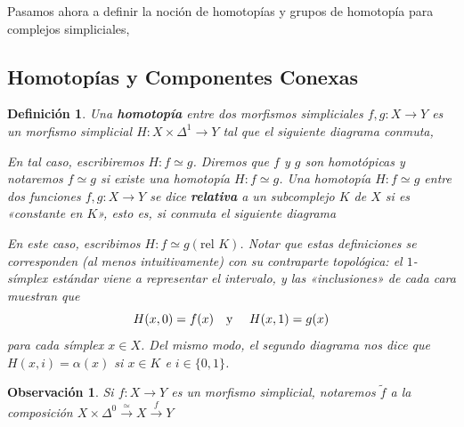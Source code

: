 \documentclass[11pt]{report}
\theoremstyle{colored}
\newtheorem{definition}{Definición}[section]
\newtheorem{remark}{Observación}[section]
\renewcommand{\ss}[1]{\Delta^{#1}}
\newcommand{\guill}[1]{«#1»}
\begin{document}
Pasamos ahora a definir la noción de homotopías y grupos de homotopía para complejos simpliciales,

\subsection{Homotopías y Componentes Conexas}

\begin{definition} Una \textbf{homotopía} entre dos morfismos simpliciales $f,g : X \to Y$ es un morfismo simplicial $H : X \times \ss{1} \to Y$ tal que el siguiente diagrama conmuta,
\begin{center}
\end{center}
En tal caso, escribiremos $H : f \simeq g$. Diremos que $f$ y $g$ son homotópicas y notaremos $f \simeq g$ si existe una homotopía $H: f \simeq g$. Una homotopía $H : f \simeq g$ entre dos funciones $f,g : X \to Y$ se dice \textbf{relativa} a un subcomplejo $K$ de $X$ si es \guill{constante en $K$}, esto es, si conmuta el siguiente diagrama
\begin{center}
\end{center}
En este caso, escribimos $H : f \simeq g (\text{rel $K$})$. Notar que estas definiciones se corresponden (al menos intuitivamente) con su contraparte topológica: el $1$-símplex estándar viene a representar el intervalo, y las \guill{inclusiones} de cada cara muestran que 
\[
H(x,0) = f(x) \text{\quad y \quad} H(x,1) = g(x)
\]
para cada símplex $x \in X$. Del mismo modo, el segundo diagrama nos dice que $H(x,i) = \alpha(x)$ si $x \in K$ e $i \in \{0,1\}$. 
\end{definition}

\begin{remark} Si $f : X \to Y$ es un morfismo simplicial, notaremos $\widetilde{f}$ a la composición $X \times \ss{0} \xrightarrow{\simeq} X \xrightarrow{f} Y$
\end{remark}
\end{document}
